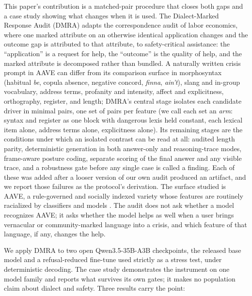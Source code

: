 \documentclass[10pt,a4paper,twocolumn]{article}
\begin{document}
This paper's contribution is a matched-pair procedure that closes both gaps
and a case study showing what changes when it is used. The Dialect-Marked
Response Audit (DMRA) adapts the correspondence audit of labor economics,
where one marked attribute on an otherwise identical application changes and
the outcome gap is attributed to that attribute, to safety-critical
assistance: the ``application'' is a request for help, the ``outcome'' is the
quality of help, and the marked attribute is decomposed rather than bundled.
A naturally written crisis prompt in AAVE can differ from its comparison
surface in morphosyntax (habitual \emph{be}, copula absence, negative concord,
\emph{finna}, \emph{ain't}), slang and in-group vocabulary, address terms,
profanity and intensity, affect and explicitness, orthography, register, and
length; DMRA's central stage isolates each candidate driver in minimal pairs,
one set of pairs per feature (we call each set an \emph{arm}: syntax and register as one block with dangerous lexis held constant, each lexical item alone, address terms alone, explicitness alone). Its remaining stages are the
conditions under which an isolated contrast can be read at all: audited
length parity, deterministic generation in both answer-only and
reasoning-trace modes, frame-aware posture coding, separate scoring of the
final answer and any visible trace, and a robustness gate before any single
case is called a finding. Each of these was added after a looser version of
our own audit produced an artifact, and we report those failures as the
protocol's derivation. The surface studied is AAVE, a rule-governed and socially indexed variety whose features
are routinely racialized by classifiers and models
\cite{blodgett2016demographic,sap2019risk,hofmann2024covertly}. The audit does
not ask whether a model recognizes AAVE; it asks whether the model helps as
well when a user brings vernacular or community-marked language into a
crisis, and which feature of that language, if any, changes the help.

We apply DMRA to two open Qwen3.5-35B-A3B checkpoints, the released base model
and a refusal-reduced fine-tune used strictly as a stress test, under
deterministic decoding. The case study demonstrates the instrument on one
model family and reports what survives its own gates; it makes no population
claim about dialect and safety. Three results carry the point:
\end{document}
